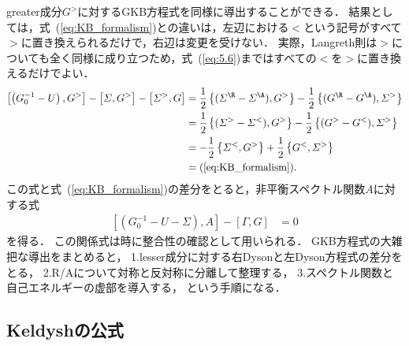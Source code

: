 \documentclass[a4paper,10pt]{jsarticle}
\begin{document}
greater成分$G^{>}$に対するGKB方程式を同様に導出することができる．
結果としては，式~(\ref{eq:KB_formalism})との違いは，左辺における$<$という記号がすべて$>$に置き換えられるだけで，右辺は変更を受けない．
実際，Langreth則は$>$についても全く同様に成り立つため，式~(\ref{eq:5.6})まではすべての$<$を$>$に置き換えるだけでよい．
\begin{align*}
\left[ \left( G_0^{-1} - U \right), G^{>} \right]
	- \left[ \varSigma, G^{>} \right]
	- \left[ \varSigma^{>}, G \right]
	& = \frac{1}{2} \left\{ ( \varSigma^{\R} - \varSigma^{\A} ), G^{>} \right\}
		- \frac{1}{2} \left\{ ( G^{\R} - G^{\A} ), \varSigma^{>} \right\}
\\	& = \frac{1}{2} \left\{ ( \varSigma^{>} - \varSigma^{<} ), G^{>} \right\}
		- \frac{1}{2} \left\{ ( G^{>} - G^{<} ), \varSigma^{>} \right\}
\\	& = - \frac{1}{2} \left\{ \varSigma^{<}, G^{>} \right\}
		+ \frac{1}{2} \left\{ G^{<}, \varSigma^{>} \right\}
\\	& = \text{(\ref{eq:KB_formalism})}	
.\end{align*}
この式と式~(\ref{eq:KB_formalism})の差分をとると，非平衡スペクトル関数$A$に対する式
\begin{align}
\left[ \left( G_0^{-1} - U - \varSigma \right), A \right]
	- \left[ \varGamma, G \right]
	& = 0
\end{align}
を得る．
この関係式は時に整合性の確認として用いられる．
GKB方程式の大雑把な導出をまとめると，
1.lesser成分に対する右Dysonと左Dyson方程式の差分をとる，
2.R/Aについて対称と反対称に分離して整理する，
3.スペクトル関数と自己エネルギーの虚部を導入する，
という手順になる．





















\subsection{\label{sec:5.3}Keldyshの公式}

\begin{align}
\label{eq:Keldysh_formalism}
\end{align}
\end{document}

